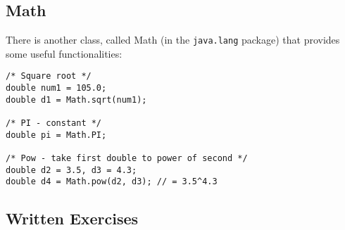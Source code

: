 \subsection{Math}
There is another class, called Math (in the \verb|java.lang| package) that provides some useful functionalities:
\begin{lstlisting}
/* Square root */
double num1 = 105.0;
double d1 = Math.sqrt(num1);

/* PI - constant */
double pi = Math.PI; 

/* Pow - take first double to power of second */
double d2 = 3.5, d3 = 4.3;
double d4 = Math.pow(d2, d3); // = 3.5^4.3
\end{lstlisting}


\subsection{Written Exercises}

